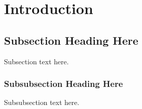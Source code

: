 \documentclass[conference]{IEEEtran}
\begin{document}
\section{Introduction}


\subsection{Subsection Heading Here} Subsection text here.


\subsubsection{Subsubsection Heading Here} Subsubsection text here.


%
%



%
%
\end{document}
